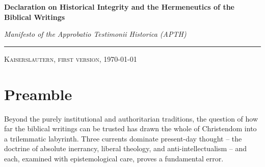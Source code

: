 \documentclass[11pt,a4paper]{article}
\newcommand{\apth}{{\apthfont APTH}\hspace{0.15em}\xspace}
\begin{document}
\begin{center}
    \thispagestyle{plain} %
    {\huge\bfseries Declaration on Historical Integrity and the Hermeneutics of the Biblical Writings\par}
    \vspace{0.4cm}
    {\Large\itshape Manifesto of the Approbatio Testimonii Historica (\apth)\par}
    \vspace{0.3cm}
    {\rule{0.5\textwidth}{0.4pt}\par}
    \vspace{0.2cm}
    {\large\scshape Kaiserslautern, first version, \today \par}
\end{center}

\vspace{0.4cm}

\section*{Preamble}

Beyond the purely institutional and authoritarian traditions, the question of how far the biblical writings can be trusted has drawn the whole of Christendom into a trilemmatic labyrinth. Three currents dominate present-day thought -- the doctrine of absolute inerrancy, liberal theology, and anti-intellectualism -- and each, examined with epistemological care, proves a fundamental error.
\end{document}
